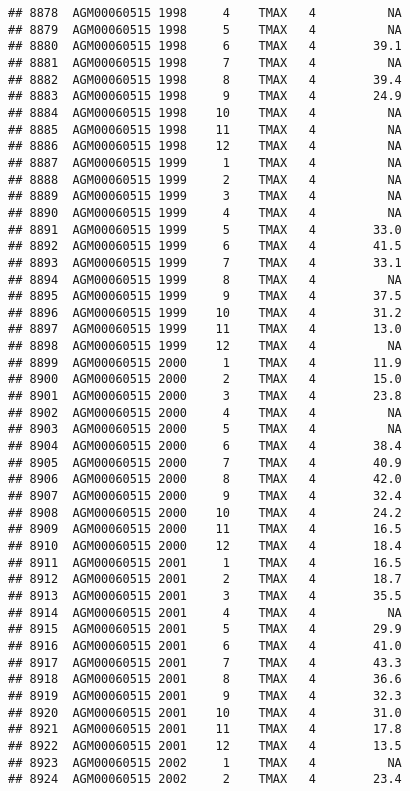 \documentclass{article}\usepackage[]{graphicx}\usepackage[]{color}
\makeatletter
\newenvironment{kframe}{%
 \def\at@end@of@kframe{}%
 \ifinner\ifhmode%
  \def\at@end@of@kframe{\end{minipage}}%
  \begin{minipage}{\columnwidth}%
 \fi\fi%
 \def\FrameCommand##1{\hskip\@totalleftmargin \hskip-\fboxsep
 \colorbox{shadecolor}{##1}\hskip-\fboxsep
     \hskip-\linewidth \hskip-\@totalleftmargin \hskip\columnwidth}%
 \MakeFramed {\advance\hsize-\width
   \@totalleftmargin\z@ \linewidth\hsize
   \@setminipage}}%
 {\par\unskip\endMakeFramed%
 \at@end@of@kframe}
\newenvironment{knitrout}{}{} %
\makeatother
\begin{document}
\begin{knitrout}
\begin{kframe}
\begin{verbatim}
## 8878  AGM00060515 1998     4    TMAX   4          NA
## 8879  AGM00060515 1998     5    TMAX   4          NA
## 8880  AGM00060515 1998     6    TMAX   4        39.1
## 8881  AGM00060515 1998     7    TMAX   4          NA
## 8882  AGM00060515 1998     8    TMAX   4        39.4
## 8883  AGM00060515 1998     9    TMAX   4        24.9
## 8884  AGM00060515 1998    10    TMAX   4          NA
## 8885  AGM00060515 1998    11    TMAX   4          NA
## 8886  AGM00060515 1998    12    TMAX   4          NA
## 8887  AGM00060515 1999     1    TMAX   4          NA
## 8888  AGM00060515 1999     2    TMAX   4          NA
## 8889  AGM00060515 1999     3    TMAX   4          NA
## 8890  AGM00060515 1999     4    TMAX   4          NA
## 8891  AGM00060515 1999     5    TMAX   4        33.0
## 8892  AGM00060515 1999     6    TMAX   4        41.5
## 8893  AGM00060515 1999     7    TMAX   4        33.1
## 8894  AGM00060515 1999     8    TMAX   4          NA
## 8895  AGM00060515 1999     9    TMAX   4        37.5
## 8896  AGM00060515 1999    10    TMAX   4        31.2
## 8897  AGM00060515 1999    11    TMAX   4        13.0
## 8898  AGM00060515 1999    12    TMAX   4          NA
## 8899  AGM00060515 2000     1    TMAX   4        11.9
## 8900  AGM00060515 2000     2    TMAX   4        15.0
## 8901  AGM00060515 2000     3    TMAX   4        23.8
## 8902  AGM00060515 2000     4    TMAX   4          NA
## 8903  AGM00060515 2000     5    TMAX   4          NA
## 8904  AGM00060515 2000     6    TMAX   4        38.4
## 8905  AGM00060515 2000     7    TMAX   4        40.9
## 8906  AGM00060515 2000     8    TMAX   4        42.0
## 8907  AGM00060515 2000     9    TMAX   4        32.4
## 8908  AGM00060515 2000    10    TMAX   4        24.2
## 8909  AGM00060515 2000    11    TMAX   4        16.5
## 8910  AGM00060515 2000    12    TMAX   4        18.4
## 8911  AGM00060515 2001     1    TMAX   4        16.5
## 8912  AGM00060515 2001     2    TMAX   4        18.7
## 8913  AGM00060515 2001     3    TMAX   4        35.5
## 8914  AGM00060515 2001     4    TMAX   4          NA
## 8915  AGM00060515 2001     5    TMAX   4        29.9
## 8916  AGM00060515 2001     6    TMAX   4        41.0
## 8917  AGM00060515 2001     7    TMAX   4        43.3
## 8918  AGM00060515 2001     8    TMAX   4        36.6
## 8919  AGM00060515 2001     9    TMAX   4        32.3
## 8920  AGM00060515 2001    10    TMAX   4        31.0
## 8921  AGM00060515 2001    11    TMAX   4        17.8
## 8922  AGM00060515 2001    12    TMAX   4        13.5
## 8923  AGM00060515 2002     1    TMAX   4          NA
## 8924  AGM00060515 2002     2    TMAX   4        23.4

\end{verbatim}
\end{kframe}
\end{knitrout}
\end{document}

